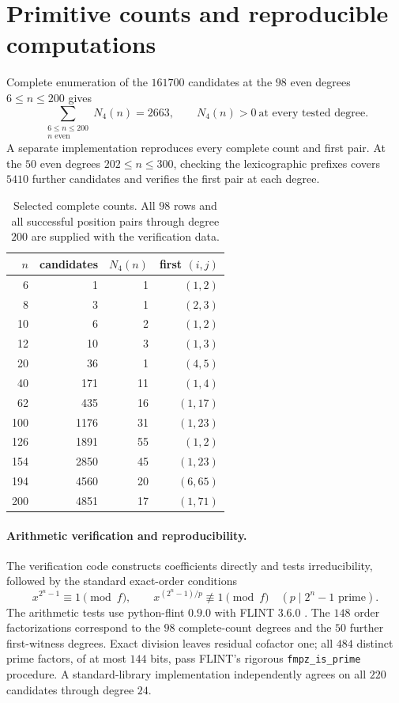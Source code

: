 \documentclass[11pt]{article}
\theoremstyle{definition}
\theoremstyle{remark}
\begin{document}
\section{Primitive counts and reproducible computations}\label{sec:computations}
Complete enumeration of the $161700$ candidates at the $98$ even degrees
$6\le n\le200$ gives
\[
 \sum_{\substack{6\le n\le200\\ n\text{ even}}}N_4(n)=2663,
 \qquad N_4(n)>0\ \text{at every tested degree}.
\]
A separate implementation reproduces every complete count and first pair.
At the $50$ even degrees $202\le n\le300$, checking the lexicographic
prefixes covers $5410$ further candidates and verifies the first pair
at each degree.

\begin{table}[ht]
\centering\small
\begin{tabular}{rrrr}
\toprule
$n$ & candidates & $N_4(n)$ & first $(i,j)$\\
\midrule
6 & 1 & 1 & $(1,2)$\\
8 & 3 & 1 & $(2,3)$\\
10 & 6 & 2 & $(1,2)$\\
12 & 10 & 3 & $(1,3)$\\
20 & 36 & 1 & $(4,5)$\\
40 & 171 & 11 & $(1,4)$\\
62 & 435 & 16 & $(1,17)$\\
100 & 1176 & 31 & $(1,23)$\\
126 & 1891 & 55 & $(1,2)$\\
154 & 2850 & 45 & $(1,23)$\\
194 & 4560 & 20 & $(6,65)$\\
200 & 4851 & 17 & $(1,71)$\\
\bottomrule
\end{tabular}
\caption{Selected complete counts. All $98$ rows and all successful
position pairs through degree $200$ are supplied with the verification data.}
\label{tab:counts}
\end{table}

\paragraph{Arithmetic verification and reproducibility.}
The verification code constructs coefficients directly and tests
irreducibility, followed by the standard exact-order conditions
\begin{equation}\label{eq:ordertest}
 x^{2^n-1}\equiv1\pmod f,\qquad
 x^{(2^n-1)/p}\not\equiv1\pmod f\quad(p\mid2^n-1\text{ prime}).
\end{equation}
The arithmetic tests use python-flint $0.9.0$ with FLINT $3.6.0$
\cite{Flint}.
The $148$ order factorizations correspond to the $98$ complete-count
degrees and the $50$ further first-witness degrees. Exact division leaves
residual cofactor one; all $484$ distinct prime factors, of at most $144$
bits, pass FLINT's rigorous \texttt{fmpz\_is\_prime} procedure.
A standard-library implementation independently agrees on all $220$
candidates through degree $24$.
\end{document}
